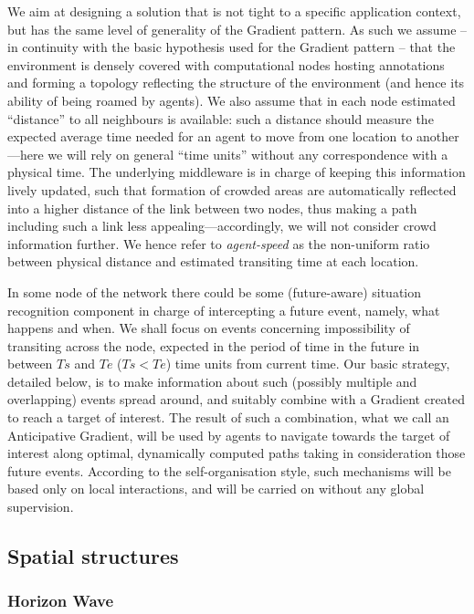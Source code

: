\documentclass[12pt,a4paper,twoside,openright]{book}
\begin{document}
We aim at designing a solution that is not tight to a specific application context, but has the same level of generality of the Gradient pattern.
%
As such we assume -- in continuity with the basic hypothesis used for the Gradient pattern -- that the environment is densely covered with computational nodes hosting annotations and forming a topology reflecting the structure of the environment (and hence its ability of being roamed by agents).
%
We also assume that in each node estimated ``distance'' to all neighbours is available: such a distance should measure the expected average time needed for an agent to move from one location to another---here we will rely on general ``time units'' without any correspondence with a physical time.
%
The underlying middleware is in charge of keeping this information lively updated, such that formation of crowded areas are automatically reflected into a higher distance of the link between two nodes, thus making a path including such a link less appealing---accordingly, we will not consider crowd information further.
%
We hence refer to \emph{agent-speed} as the non-uniform ratio between physical distance and estimated transiting time at each location.

In some node of the network there could be some (future-aware) situation recognition component \cite{YeDM12} in charge of intercepting a future event, namely, what happens and when.
%
We shall focus on events concerning impossibility of transiting across the node, expected in the period of time in the future in between $Ts$ and $Te$ ($Ts<Te$) time units from current time.
%
Our basic strategy, detailed below, is to make information about such (possibly multiple and overlapping) events spread around, and suitably combine with a Gradient created to reach a target of interest.
%
The result of such a combination, what we call an Anticipative Gradient, will be used by agents to navigate towards the target of interest along optimal, dynamically computed paths taking in consideration those future events.
%
According to the self-organisation style, such mechanisms will be based only on local interactions, and will be carried on without any global supervision.

\subsection{Spatial structures}

\subsubsection{Horizon Wave}
\end{document}
